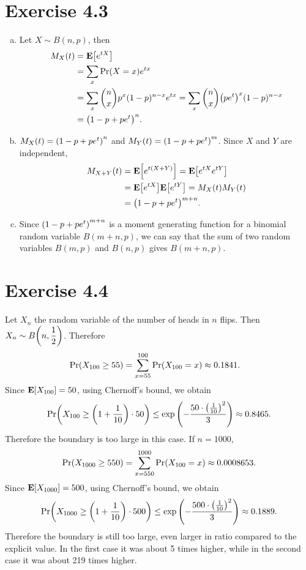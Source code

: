\documentclass{article}
\begin{document}
\section*{Exercise 4.3}
\begin{enumerate}[(a)]
  \item Let $X \sim B(n, p)$, then
  \begin{align*}
    M_X(t) &= \mathbf{E}\qty[e^{tX}] \\
    &= \sum_{x}\mathrm{Pr}\qty(X=x)e^{tx} \\
    &= \sum_{x}{n \choose x}p^x(1-p)^{n-x}e^{tx} = \sum_{x}{n \choose x}\qty(pe^t)^x(1-p)^{n-x} \\
    &= \qty(1-p+pe^t)^n.
  \end{align*}
  \item $M_X(t) = \qty(1-p+pe^t)^n$ and $M_Y(t) = \qty(1-p+pe^t)^m$.
  Since $X$ and $Y$ are independent, 
  \begin{align*}
    M_{X+Y}(t) &= \mathbf{E}\qty[e^{t(X+Y)}] = \mathbf{E}\qty[e^{tX}e^{tY}] \\
    &= \mathbf{E}\qty[e^{tX}]\mathbf{E}\qty[e^{tY}] = M_X(t)M_Y(t) \\
    &= \qty(1-p+pe^t)^{m+n}.
  \end{align*}
  \item Since $\qty(1-p+pe^t)^{m+n}$ is a moment generating function for a binomial random variable $B(m+n, p)$, we can say that the sum of two random variables $B(m, p)$ and $B(n, p)$ gives $B(m+n, p)$.
\end{enumerate}

\section*{Exercise 4.4}
Let $X_n$ the random variable of the number of heads in $n$ flips.
Then $X_n \sim B\qty(n, \dfrac{1}{2})$.
Therefore
\begin{align*}
  \mathrm{Pr}\qty(X_{100} \geq 55) &= \sum_{x=55}^{100}\mathrm{Pr}\qty(X_{100} = x) \approx 0.1841.
\end{align*}
Since $\mathbf{E}\qty[X_{100}] = 50$, using Chernoff's bound, we obtain
\begin{align*}
  \mathrm{Pr}\qty(X_{100} \geq \qty(1 + \frac{1}{10})\cdot 50) \leq \exp\qty(-\frac{50\cdot\qty(\frac{1}{10})^2}{3}) \approx 0.8465.
\end{align*}
Therefore the boundary is too large in this case. 
If $n=1000$,
\begin{align*}
  \mathrm{Pr}\qty(X_{1000} \geq 550) = \sum_{x=550}^{1000}\mathrm{Pr}\qty(X_{100} = x) \approx 0.0008653.
\end{align*}
Since $\mathbf{E}\qty[X_{1000}] = 500$, using Chernoff's bound, we obtain
\begin{align*}
  \mathrm{Pr}\qty(X_{1000} \geq \qty(1 + \frac{1}{10})\cdot 500) \leq \exp\qty(-\frac{500\cdot\qty(\frac{1}{10})^2}{3}) \approx 0.1889.
\end{align*}
Therefore the boundary is still too large, even larger in ratio compared to the explicit value.
In the first case it was about 5 times higher, while in the second case it was about 219 times higher. 
\end{document}
